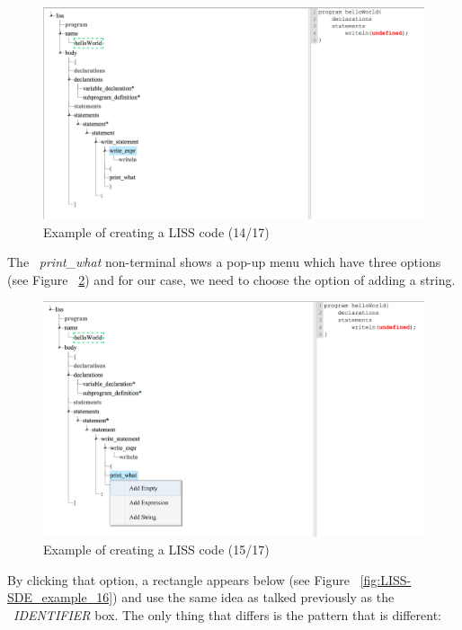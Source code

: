 \documentclass[
  oneside,
  11pt, a4paper,
  footinclude=true,
  headinclude=true,
  cleardoublepage=empty
]{scrbook}
\begin{document}
\begin{figure}[h!]
  \centering
    \includegraphics[width=1\textwidth]{img/LISS-SDE_creating_program/LISS-SDE14.png}
    \caption{Example of creating a LISS code (14/17)}
    \label{fig:LISS-SDE_example_14}
\end{figure}

The ~\textit{print\_what} non-terminal shows a pop-up menu which have three options (see Figure ~\ref{fig:LISS-SDE_example_15}) and for our case, we need to choose the option of adding a string.

\begin{figure}[h!]
  \centering
    \includegraphics[width=1\textwidth]{img/LISS-SDE_creating_program/LISS-SDE15.png}
    \caption{Example of creating a LISS code (15/17)}
    \label{fig:LISS-SDE_example_15}
\end{figure}

By clicking that option, a rectangle appears below (see Figure ~\ref{fig:LISS-SDE_example_16}) and use the same idea as talked previously as  the ~\textit{IDENTIFIER} box. The only thing that differs is the pattern that is different:
\end{document}
